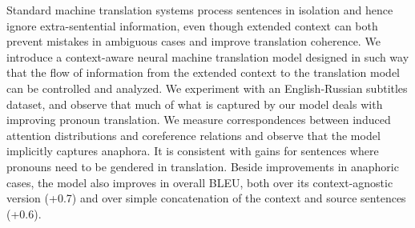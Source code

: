 Standard machine translation systems process sentences in isolation and hence ignore extra-sentential information, even though extended context can both prevent mistakes in ambiguous cases and improve translation coherence. We introduce a context-aware neural machine translation model designed in such way that the flow of information from the extended context to the translation model can be controlled and analyzed. We experiment with an English-Russian subtitles dataset, and observe that much of what is captured by our model deals with improving pronoun translation. We measure correspondences between induced attention distributions and coreference relations and observe that the model implicitly captures anaphora. It is consistent with gains for sentences where pronouns need to be gendered in translation. Beside improvements in anaphoric cases, the model also improves in overall BLEU, both over its context-agnostic version (+0.7) and over simple concatenation of the context and source sentences (+0.6).
